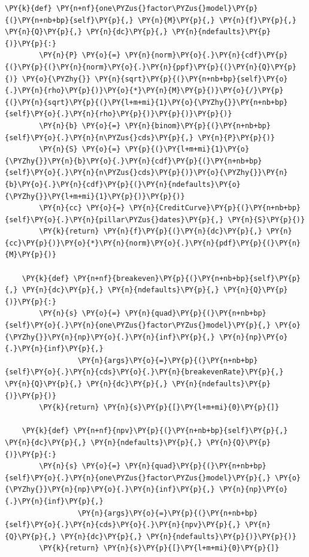 \begin{tcolorbox}[breakable, size=fbox, boxrule=1pt, pad at break*=1mm,colback=cellbackground, colframe=cellborder]
\begin{Verbatim}[commandchars=\\\{\}]
    \PY{k}{def} \PY{n+nf}{one\PYZus{}factor\PYZus{}model}\PY{p}{(}\PY{n+nb+bp}{self}\PY{p}{,} \PY{n}{M}\PY{p}{,} \PY{n}{f}\PY{p}{,} \PY{n}{Q}\PY{p}{,} \PY{n}{dc}\PY{p}{,} \PY{n}{ndefaults}\PY{p}{)}\PY{p}{:}
        \PY{n}{P} \PY{o}{=} \PY{n}{norm}\PY{o}{.}\PY{n}{cdf}\PY{p}{(}\PY{p}{(}\PY{n}{norm}\PY{o}{.}\PY{n}{ppf}\PY{p}{(}\PY{n}{Q}\PY{p}{)} \PY{o}{\PYZhy{}} \PY{n}{sqrt}\PY{p}{(}\PY{n+nb+bp}{self}\PY{o}{.}\PY{n}{rho}\PY{p}{)}\PY{o}{*}\PY{n}{M}\PY{p}{)}\PY{o}{/}\PY{p}{(}\PY{n}{sqrt}\PY{p}{(}\PY{l+m+mi}{1}\PY{o}{\PYZhy{}}\PY{n+nb+bp}{self}\PY{o}{.}\PY{n}{rho}\PY{p}{)}\PY{p}{)}\PY{p}{)}
        \PY{n}{b} \PY{o}{=} \PY{n}{binom}\PY{p}{(}\PY{n+nb+bp}{self}\PY{o}{.}\PY{n}{n\PYZus{}cds}\PY{p}{,} \PY{n}{P}\PY{p}{)}
        \PY{n}{S} \PY{o}{=} \PY{p}{(}\PY{l+m+mi}{1}\PY{o}{\PYZhy{}}\PY{n}{b}\PY{o}{.}\PY{n}{cdf}\PY{p}{(}\PY{n+nb+bp}{self}\PY{o}{.}\PY{n}{n\PYZus{}cds}\PY{p}{)}\PY{o}{\PYZhy{}}\PY{n}{b}\PY{o}{.}\PY{n}{cdf}\PY{p}{(}\PY{n}{ndefaults}\PY{o}{\PYZhy{}}\PY{l+m+mi}{1}\PY{p}{)}\PY{p}{)}
        \PY{n}{cc} \PY{o}{=} \PY{n}{CreditCurve}\PY{p}{(}\PY{n+nb+bp}{self}\PY{o}{.}\PY{n}{pillar\PYZus{}dates}\PY{p}{,} \PY{n}{S}\PY{p}{)}
        \PY{k}{return} \PY{n}{f}\PY{p}{(}\PY{n}{dc}\PY{p}{,} \PY{n}{cc}\PY{p}{)}\PY{o}{*}\PY{n}{norm}\PY{o}{.}\PY{n}{pdf}\PY{p}{(}\PY{n}{M}\PY{p}{)}
		
    \PY{k}{def} \PY{n+nf}{breakeven}\PY{p}{(}\PY{n+nb+bp}{self}\PY{p}{,} \PY{n}{dc}\PY{p}{,} \PY{n}{ndefaults}\PY{p}{,} \PY{n}{Q}\PY{p}{)}\PY{p}{:}
        \PY{n}{s} \PY{o}{=} \PY{n}{quad}\PY{p}{(}\PY{n+nb+bp}{self}\PY{o}{.}\PY{n}{one\PYZus{}factor\PYZus{}model}\PY{p}{,} \PY{o}{\PYZhy{}}\PY{n}{np}\PY{o}{.}\PY{n}{inf}\PY{p}{,} \PY{n}{np}\PY{o}{.}\PY{n}{inf}\PY{p}{,} 
                 \PY{n}{args}\PY{o}{=}\PY{p}{(}\PY{n+nb+bp}{self}\PY{o}{.}\PY{n}{cds}\PY{o}{.}\PY{n}{breakevenRate}\PY{p}{,} \PY{n}{Q}\PY{p}{,} \PY{n}{dc}\PY{p}{,} \PY{n}{ndefaults}\PY{p}{)}\PY{p}{)}
        \PY{k}{return} \PY{n}{s}\PY{p}{[}\PY{l+m+mi}{0}\PY{p}{]}
		
    \PY{k}{def} \PY{n+nf}{npv}\PY{p}{(}\PY{n+nb+bp}{self}\PY{p}{,} \PY{n}{dc}\PY{p}{,} \PY{n}{ndefaults}\PY{p}{,} \PY{n}{Q}\PY{p}{)}\PY{p}{:}
        \PY{n}{s} \PY{o}{=} \PY{n}{quad}\PY{p}{(}\PY{n+nb+bp}{self}\PY{o}{.}\PY{n}{one\PYZus{}factor\PYZus{}model}\PY{p}{,} \PY{o}{\PYZhy{}}\PY{n}{np}\PY{o}{.}\PY{n}{inf}\PY{p}{,} \PY{n}{np}\PY{o}{.}\PY{n}{inf}\PY{p}{,} 
                 \PY{n}{args}\PY{o}{=}\PY{p}{(}\PY{n+nb+bp}{self}\PY{o}{.}\PY{n}{cds}\PY{o}{.}\PY{n}{npv}\PY{p}{,} \PY{n}{Q}\PY{p}{,} \PY{n}{dc}\PY{p}{,} \PY{n}{ndefaults}\PY{p}{)}\PY{p}{)}
        \PY{k}{return} \PY{n}{s}\PY{p}{[}\PY{l+m+mi}{0}\PY{p}{]}        
\end{Verbatim}
\end{tcolorbox}

